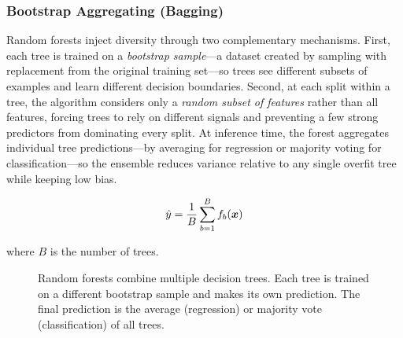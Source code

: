 \subsubsection{Bootstrap Aggregating (Bagging)}

Random forests inject diversity through two complementary mechanisms. First, each tree is trained on a \emph{bootstrap sample}—a dataset created by sampling with replacement from the original training set—so trees see different subsets of examples and learn different decision boundaries. Second, at each split within a tree, the algorithm considers only a \emph{random subset of features} rather than all features, forcing trees to rely on different signals and preventing a few strong predictors from dominating every split. At inference time, the forest aggregates individual tree predictions—by averaging for regression or majority voting for classification—so the ensemble reduces variance relative to any single overfit tree while keeping low bias.

\begin{equation}
\hat{y} = \frac{1}{B} \sum_{b=1}^{B} f_b(\boldsymbol{x})
\end{equation}

where $B$ is the number of trees.

\begin{figure}[htbp]
\centering
{}
\caption{Random forests combine multiple decision trees. Each tree is trained on a different bootstrap sample and makes its own prediction. The final prediction is the average (regression) or majority vote (classification) of all trees.}
\label{fig:random-forest}
\end{figure}

